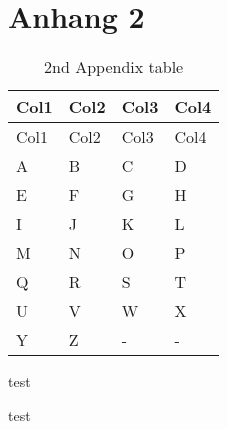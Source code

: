 \documentclass[
  11pt,
  letterpaper,
]{scrbook}
\begin{document}
\hypertarget{anhang-2}{%
\chapter{Anhang 2}\label{anhang-2}}

\setcounter{page}{1}
\renewcommand{\thepage}{\thechapter.\arabic{page}} %

\hypertarget{tbl-letters2-full}{}
\begin{longtable}[]{@{}llll@{}}
\caption{\label{tbl-letters2-full}2nd Appendix table}\tabularnewline
\toprule\noalign{}
Col1 & Col2 & Col3 & Col4 \\
\midrule\noalign{}
\endfirsthead
\toprule\noalign{}
Col1 & Col2 & Col3 & Col4 \\
\midrule\noalign{}
\endhead
\bottomrule\noalign{}
\endlastfoot
A & B & C & D \\
E & F & G & H \\
I & J & K & L \\
M & N & O & P \\
Q & R & S & T \\
U & V & W & X \\
Y & Z & - & - \\
\end{longtable}

\newpage{}

test

\newpage{}

test


\backmatter
\end{document}
